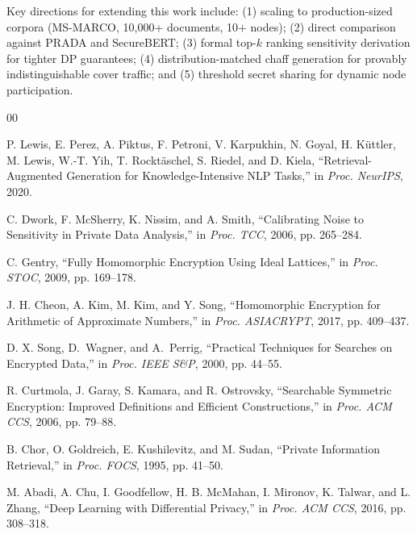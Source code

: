 \documentclass[conference]{IEEEtran}
\begin{document}
Key directions for extending this work include: (1) scaling to production-sized corpora (MS-MARCO, 10,000+ documents, 10+ nodes); (2) direct comparison against PRADA and SecureBERT; (3) formal top-$k$ ranking sensitivity derivation for tighter DP guarantees; (4) distribution-matched chaff generation for provably indistinguishable cover traffic; and (5) threshold secret sharing for dynamic node participation.



\begin{thebibliography}{00}

P. Lewis, E. Perez, A. Piktus, F. Petroni, V. Karpukhin, N. Goyal, H. K\"{u}ttler, M. Lewis, W.-T. Yih, T. Rockt\"{a}schel, S. Riedel, and D. Kiela, ``Retrieval-Augmented Generation for Knowledge-Intensive NLP Tasks,'' in \textit{Proc. NeurIPS}, 2020.

C. Dwork, F. McSherry, K. Nissim, and A. Smith, ``Calibrating Noise to Sensitivity in Private Data Analysis,'' in \textit{Proc. TCC}, 2006, pp. 265--284.

C. Gentry, ``Fully Homomorphic Encryption Using Ideal Lattices,'' in \textit{Proc. STOC}, 2009, pp. 169--178.

J. H. Cheon, A. Kim, M. Kim, and Y. Song, ``Homomorphic Encryption for Arithmetic of Approximate Numbers,'' in \textit{Proc. ASIACRYPT}, 2017, pp. 409--437.

D. X. Song, D.~Wagner, and A.~Perrig, ``Practical Techniques for Searches on Encrypted Data,'' in \textit{Proc. IEEE S\&P}, 2000, pp. 44--55.

R. Curtmola, J. Garay, S. Kamara, and R. Ostrovsky, ``Searchable Symmetric Encryption: Improved Definitions and Efficient Constructions,'' in \textit{Proc. ACM CCS}, 2006, pp. 79--88.

B. Chor, O. Goldreich, E. Kushilevitz, and M. Sudan, ``Private Information Retrieval,'' in \textit{Proc. FOCS}, 1995, pp. 41--50.

M. Abadi, A. Chu, I. Goodfellow, H. B. McMahan, I. Mironov, K. Talwar, and L. Zhang, ``Deep Learning with Differential Privacy,'' in \textit{Proc. ACM CCS}, 2016, pp. 308--318.


\end{thebibliography}
\end{document}
